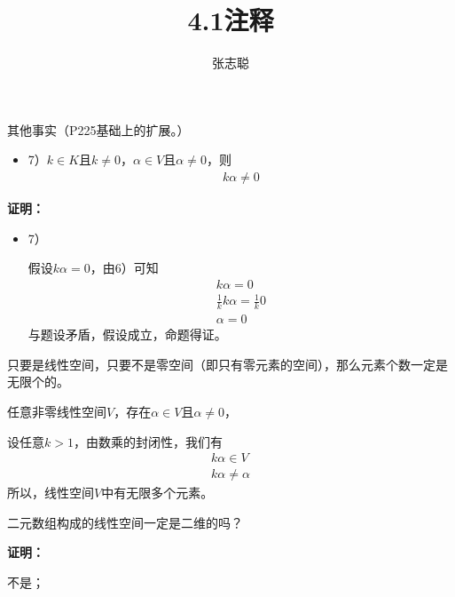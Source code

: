 \documentclass{article}
\begin{document}
\title{4.1注释}
\author{张志聪}
\maketitle

\begin{zremark}
  其他事实（P225基础上的扩展。）
  \begin{itemize}
    \item 7）$k \in K$且$k \neq 0$，$\alpha \in V$且$\alpha \neq 0$，则
          \begin{align*}
            k \alpha \neq 0
          \end{align*}
  \end{itemize}
\end{zremark}

\textbf{证明：}

\begin{itemize}
  \item 7）

        假设$k \alpha = 0$，由6）可知
        \begin{align*}
          k \alpha = 0                         \\
          \frac{1}{k} k \alpha = \frac{1}{k} 0 \\
          \alpha = 0
        \end{align*}
        与题设矛盾，假设成立，命题得证。

\end{itemize}

\begin{zremark}
  只要是线性空间，只要不是零空间（即只有零元素的空间），那么元素个数一定是无限个的。
\end{zremark}

任意非零线性空间$V$，存在$\alpha \in V$且$\alpha \neq 0$，

设任意$k > 1$，由数乘的封闭性，我们有
\begin{align*}
  k \alpha \in V \\
  k \alpha \neq \alpha
\end{align*}
所以，线性空间$V$中有无限多个元素。

\begin{zremark}
  二元数组构成的线性空间一定是二维的吗？
\end{zremark}

\textbf{证明：}

不是；
\end{document}
